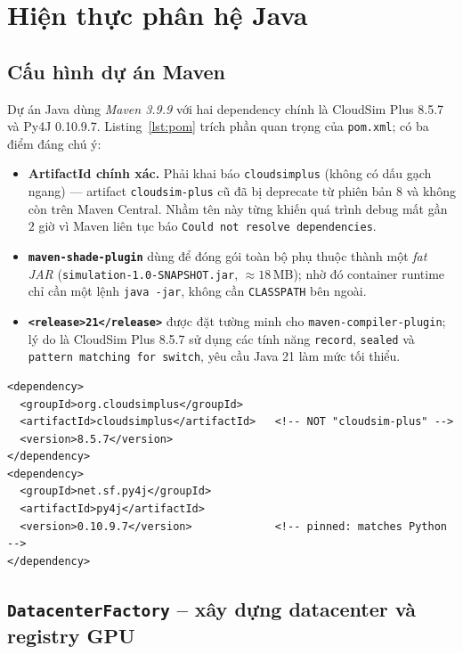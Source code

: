 \section{Hiện thực phân hệ Java}
\label{sec:impl-java}

\subsection{Cấu hình dự án Maven}
\label{ssec:maven}

Dự án Java dùng \emph{Maven 3.9.9} với hai dependency chính là
CloudSim Plus 8.5.7 và Py4J 0.10.9.7. Listing~\ref{lst:pom} trích phần
quan trọng của \texttt{pom.xml}; có ba điểm đáng chú ý:
\begin{itemize}
  \item \textbf{ArtifactId chính xác.} Phải khai báo
        \texttt{cloudsimplus} (không có dấu gạch ngang) ---
        artifact \texttt{cloudsim-plus} cũ đã bị deprecate từ phiên
        bản 8 và không còn trên Maven Central. Nhầm tên này từng
        khiến quá trình debug mất gần $2$ giờ vì Maven liên tục báo
        \texttt{Could not resolve dependencies}.
  \item \textbf{\texttt{maven-shade-plugin}} dùng để đóng gói toàn
        bộ phụ thuộc thành một \emph{fat JAR}
        (\texttt{simulation-1.0-SNAPSHOT.jar}, $\approx 18$\,MB); nhờ
        đó container runtime chỉ cần một lệnh \texttt{java -jar}, không
        cần \texttt{CLASSPATH} bên ngoài.
  \item \textbf{\texttt{<release>21</release>}} được đặt tường minh
        cho \texttt{maven-compiler-plugin}; lý do là CloudSim Plus
        8.5.7 sử dụng các tính năng \texttt{record}, \texttt{sealed}
        và \texttt{pattern matching for switch}, yêu cầu Java 21
        làm mức tối thiểu.
\end{itemize}

\begin{lstlisting}[style=javastyle, caption={\texttt{pom.xml} -- trích đoạn
hai dependency chính.}, label={lst:pom},
language={[LaTeX]TeX}]
<dependency>
  <groupId>org.cloudsimplus</groupId>
  <artifactId>cloudsimplus</artifactId>   <!-- NOT "cloudsim-plus" -->
  <version>8.5.7</version>
</dependency>
<dependency>
  <groupId>net.sf.py4j</groupId>
  <artifactId>py4j</artifactId>
  <version>0.10.9.7</version>             <!-- pinned: matches Python -->
</dependency>
\end{lstlisting}

\subsection{\texttt{DatacenterFactory} -- xây dựng datacenter và registry GPU}
\label{ssec:impl-factory}


